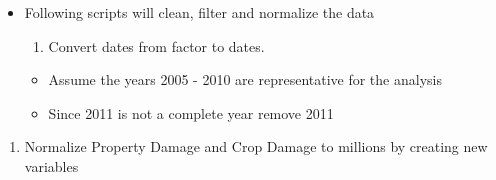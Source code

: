 \documentclass[]{article}
\newenvironment{Shaded}{\begin{snugshade}}{\end{snugshade}}
\newcommand{\CommentTok}[1]{\textcolor[rgb]{0.56,0.35,0.01}{\textit{#1}}}
\newcommand{\KeywordTok}[1]{\textcolor[rgb]{0.13,0.29,0.53}{\textbf{#1}}}
\newcommand{\NormalTok}[1]{#1}
\newcommand{\OperatorTok}[1]{\textcolor[rgb]{0.81,0.36,0.00}{\textbf{#1}}}
\newcommand{\StringTok}[1]{\textcolor[rgb]{0.31,0.60,0.02}{#1}}
\providecommand{\tightlist}{%
  \setlength{\itemsep}{0pt}\setlength{\parskip}{0pt}}
\begin{document}
\begin{itemize}
\tightlist
\item
  Following scripts will clean, filter and normalize the data

  \begin{enumerate}
  \def\labelenumi{\arabic{enumi}.}
  \tightlist
  \item
    Convert dates from factor to dates.
  \end{enumerate}

  \begin{itemize}
  \tightlist
  \item
    Assume the years 2005 - 2010 are representative for the analysis
  \item
    Since 2011 is not a complete year remove 2011
  \end{itemize}
\end{itemize}

\begin{Shaded}
\end{Shaded}

\begin{enumerate}
\def\labelenumi{\arabic{enumi}.}
\setcounter{enumi}{1}
\tightlist
\item
  Normalize Property Damage and Crop Damage to millions by creating new
  variables
\end{enumerate}
\end{document}
